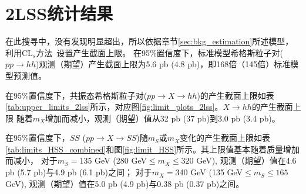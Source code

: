 \section{2LSS统计结果}\label{sec:statistics}
在此搜寻中，没有发现明显超出，所以依据章节\ref{sec:bkg_estimation}所述模型，利用CL$_s$方法~\cite{Read:2002hq}设置产生截面上限。
  在95\%置信度下，标准模型希格斯粒子对($pp\rightarrow hh$)观测（期望）产生截面上限为5.6 pb (4.8 pb)，即168倍（145倍）标准模型预测值。

  在95\%置信度下，共振态希格斯粒子对($pp\rightarrow X \rightarrow hh$)的产生截面上限如表\ref{tab:upper_limits_2lss}所示，对应图\ref{fig:limit_plots_2lss}。$X\rightarrow hh$的产生截面上限
  随着$m_X$增加而减小，观测（期望）值从32 pb (37 pb)到3.0 pb (3.4 pb)。

  在95\%置信度下，$SS$ ($pp\rightarrow X\rightarrow SS$)随$m_S$或$m_X$变化的产生截面上限如表\ref{tab:limits_HSS_combined}和图\ref{fig:limit_HSS}所示。其上限值基本随着质量增加而减小，
  对于$m_S=$135 GeV (280 GeV$\leq m_X \leq 320$ GeV), 观测（期望）值在4.6 pb (5.7 pb)与4.9 pb (6.1 pb)之间；
 对于$m_X=$340 GeV (135 GeV$\leq m_S \leq 165$ GeV), 观测（期望）值在5.0 pb (4.9 pb)与0.38 pb (0.37 pb)之间。  

